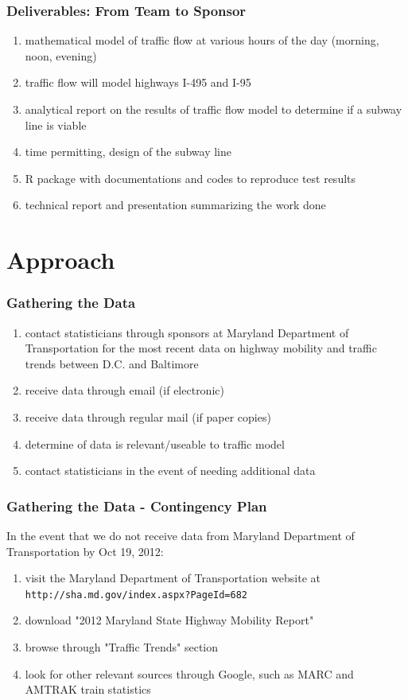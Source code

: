 \documentclass[compress,handout,10pt]{beamer}
\let\olditem\item
\renewcommand{\item}{\setlength{\itemsep}{0.5\baselineskip}\olditem}
\begin{document}
\begin{frame}
    \frametitle{Deliverables: From Team to Sponsor}
    \begin{enumerate}
        \item mathematical model of traffic flow at various hours of the day (morning, noon, evening)
	\item traffic flow will model highways I-495 and I-95
	\item analytical report on the results of traffic flow model to determine if a subway line is viable
	\item time permitting, design of the subway line
	\item R package with documentations and codes to reproduce test results
	\item technical report and presentation summarizing the work done
    \end{enumerate}
\end{frame}

\section{Approach}
\begin{frame}
    \frametitle{Gathering the Data}
     \begin{enumerate}
	\item contact statisticians through sponsors at Maryland Department of Transportation for the most recent data on highway mobility and traffic trends between D.C. and Baltimore
	\item receive data through email (if electronic)
	\item receive data through regular mail (if paper copies)
	\item determine of data is relevant/useable to traffic model
	\item contact statisticians in the event of needing additional data
     \end{enumerate}
\end{frame}

\begin{frame}
    \frametitle{Gathering the Data - Contingency Plan}
    In the event that we do not receive data from Maryland Department of Transportation by Oct 19, 2012:
     \begin{enumerate}
    \vspace{7pt}
	\item visit the Maryland Department of Transportation website at \texttt{http://sha.md.gov/index.aspx?PageId=682}
	\item download "2012 Maryland State Highway Mobility Report"
	\item browse through "Traffic Trends" section
	\item look for other relevant sources through Google, such as MARC and AMTRAK train statistics
     \end{enumerate}
\end{frame}
\end{document}
